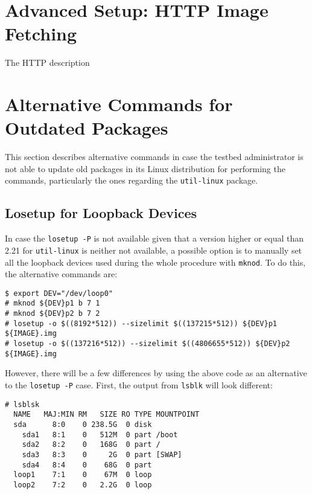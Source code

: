 \section{Advanced Setup: HTTP Image Fetching}
\label{sec:http}

The HTTP description

\section{Alternative Commands for Outdated Packages}
This section describes alternative commands in case the testbed administrator
is not able to update old packages in its Linux distribution for performing
the commands, particularly the ones regarding the \texttt{util-linux} package.

\subsection{Losetup for Loopback Devices}
\label{sec:alternative_losetup}

In case the \texttt{losetup -P} is not available given that a version
higher or equal than 2.21 for \texttt{util-linux} is neither not available,
a possible option is to manually set all the loopback devices used during the
whole procedure with \texttt{mknod}. To do this, the alternative commands are:

\begin{lstlisting}[]
$ export DEV="/dev/loop0"
# mknod ${DEV}p1 b 7 1
# mknod ${DEV}p2 b 7 2
# losetup -o $((8192*512)) --sizelimit $((137215*512)) ${DEV}p1 ${IMAGE}.img
# losetup -o $((137216*512)) --sizelimit $((4806655*512)) ${DEV}p2 ${IMAGE}.img
\end{lstlisting}
\FloatBarrier
\vspace{-5mm}

However, there will be a few differences by using the above code as an
alternative to the \texttt{losetup -P} case. First, the output from
\texttt{lsblk} will look different:

\begin{lstlisting}[]
# lsblsk
  NAME   MAJ:MIN RM   SIZE RO TYPE MOUNTPOINT
  sda      8:0    0 238.5G  0 disk
    sda1   8:1    0   512M  0 part /boot
    sda2   8:2    0   168G  0 part /
    sda3   8:3    0     2G  0 part [SWAP]
    sda4   8:4    0    68G  0 part
  loop1    7:1    0    67M  0 loop
  loop2    7:2    0   2.2G  0 loop
\end{lstlisting}
\FloatBarrier
\vspace{-5mm}

